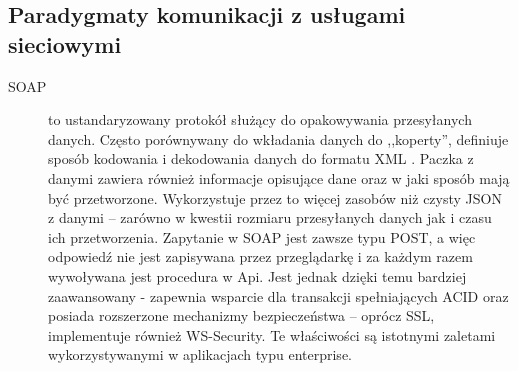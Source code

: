 	\subsection{Paradygmaty komunikacji z usługami sieciowymi}
		\begin{description}
			\item[SOAP] to ustandaryzowany protokół służący do opakowywania przesyłanych danych. 
				Często porównywany do wkładania danych do ,,koperty'', definiuje sposób kodowania i dekodowania danych do formatu XML \cite{SOAP}.
				Paczka z danymi zawiera również informacje opisujące dane oraz w jaki sposób mają być przetworzone.
				Wykorzystuje przez to więcej zasobów niż czysty JSON z danymi -- zarówno w kwestii rozmiaru przesyłanych danych jak i czasu ich przetworzenia.
				Zapytanie w SOAP jest zawsze typu POST, a więc odpowiedź nie jest zapisywana przez przeglądarkę i za każdym razem wywoływana jest procedura w Api.
				Jest jednak dzięki temu bardziej zaawansowany - zapewnia wsparcie dla transakcji spełniających ACID
				oraz posiada rozszerzone mechanizmy bezpieczeństwa -- oprócz SSL, implementuje również WS-Security.
				Te właściwości są istotnymi zaletami wykorzystywanymi w aplikacjach typu enterprise.



\end{description}
